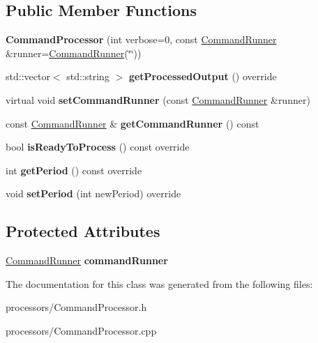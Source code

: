 \subsection*{Public Member Functions}
\begin{DoxyCompactItemize}
\item 
\hypertarget{classCommandProcessor_a8efe4696ca63e76dfabe66a5e1ae975c}{{\bfseries Command\-Processor} (int verbose=0, const \hyperlink{classCommandRunner}{Command\-Runner} \&runner=\hyperlink{classCommandRunner}{Command\-Runner}(\char`\"{}\char`\"{}))}\label{classCommandProcessor_a8efe4696ca63e76dfabe66a5e1ae975c}

\item 
\hypertarget{classCommandProcessor_ae1415f17b13b6017839e1dff5c384e2c}{std\-::vector$<$ std\-::string $>$ {\bfseries get\-Processed\-Output} () override}\label{classCommandProcessor_ae1415f17b13b6017839e1dff5c384e2c}

\item 
\hypertarget{classCommandProcessor_af344f7b0c5ee1bf8b6f675135ff0a7c5}{virtual void {\bfseries set\-Command\-Runner} (const \hyperlink{classCommandRunner}{Command\-Runner} \&runner)}\label{classCommandProcessor_af344f7b0c5ee1bf8b6f675135ff0a7c5}

\item 
\hypertarget{classCommandProcessor_acaaef0cbb658a65eebe42d6ef4106449}{const \hyperlink{classCommandRunner}{Command\-Runner} \& {\bfseries get\-Command\-Runner} () const }\label{classCommandProcessor_acaaef0cbb658a65eebe42d6ef4106449}

\item 
\hypertarget{classCommandProcessor_ae1b2f30c9de7dcfad246f4612afe7bb8}{bool {\bfseries is\-Ready\-To\-Process} () const override}\label{classCommandProcessor_ae1b2f30c9de7dcfad246f4612afe7bb8}

\item 
\hypertarget{classCommandProcessor_abb5a1f0942b285a0ae06b6cbce225621}{int {\bfseries get\-Period} () const override}\label{classCommandProcessor_abb5a1f0942b285a0ae06b6cbce225621}

\item 
\hypertarget{classCommandProcessor_a6366c78835ecc66e0dcfa3094a194de2}{void {\bfseries set\-Period} (int new\-Period) override}\label{classCommandProcessor_a6366c78835ecc66e0dcfa3094a194de2}

\end{DoxyCompactItemize}
\subsection*{Protected Attributes}
\begin{DoxyCompactItemize}
\item 
\hypertarget{classCommandProcessor_a136f0b6c6c6133675ce7aa22d582128e}{\hyperlink{classCommandRunner}{Command\-Runner} {\bfseries command\-Runner}}\label{classCommandProcessor_a136f0b6c6c6133675ce7aa22d582128e}

\end{DoxyCompactItemize}


The documentation for this class was generated from the following files\-:\begin{DoxyCompactItemize}
\item 
processors/Command\-Processor.\-h\item 
processors/Command\-Processor.\-cpp\end{DoxyCompactItemize}
